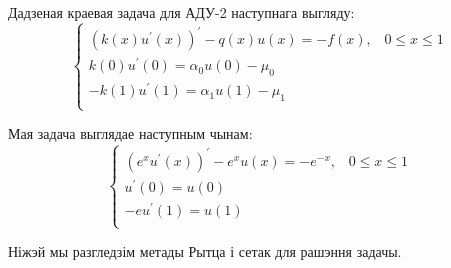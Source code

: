 Дадзеная краевая задача для АДУ-2 наступнага выгляду:
\begin{equation}
    \begin{cases}
        (k(x)u^{\prime}(x))^{\prime} - q(x)u(x) = -f(x), \hspace{10pt} 0 \leq x \leq 1 \\
        k(0)u^{\prime}(0) = \alpha_{0}u(0) - \mu_{0} \\
        -k(1)u^{\prime}(1) = \alpha_{1}u(1) - \mu_{1} \\
    \end{cases}
\end{equation}

Мая задача выглядае наступным чынам:
\begin{equation}
    \begin{cases}
        (e^{x}u^{\prime}(x))^{\prime} - e^{x}u(x) = -e^{-x}, \hspace{10pt} 0 \leq x \leq 1 \\
        u^{\prime}(0) = u(0) \\
        -eu^{\prime}(1) = u(1) \\
    \end{cases}
\end{equation}

Ніжэй мы разгледзім метады Рытца і сетак для рашэння задачы.
